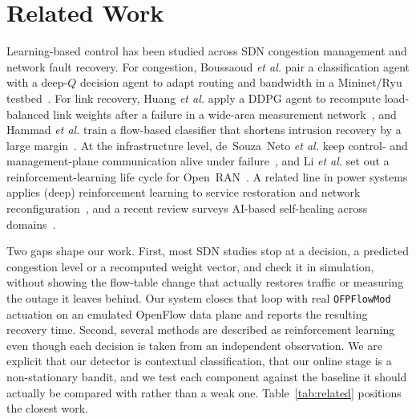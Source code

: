 \documentclass[conference]{IEEEtran}
\begin{document}
\section{Related Work}
\label{sec:related}
Learning-based control has been studied across SDN congestion management and network
fault recovery. For congestion, Boussaoud \emph{et al.} pair a classification agent
with a deep-$Q$ decision agent to adapt routing and bandwidth in a Mininet/Ryu
testbed~\cite{boussaoud2025}. For link recovery, Huang \emph{et al.} apply a DDPG
agent to recompute load-balanced link weights after a failure in a wide-area
measurement network~\cite{huang2025}, and Hammad \emph{et al.} train a flow-based
classifier that shortens intrusion recovery by a large margin~\cite{hammad2023}. At
the infrastructure level, de~Souza~Neto \emph{et al.} keep control- and
management-plane communication alive under failure~\cite{neto2020}, and Li
\emph{et al.} set out a reinforcement-learning life cycle for Open~RAN~\cite{li2022rlops}.
A related line in power systems applies (deep) reinforcement learning to service
restoration and network reconfiguration~\cite{ferreira2019,jo2024}, and a recent
review surveys AI-based self-healing across domains~\cite{kumar2023}.

Two gaps shape our work. First, most SDN studies stop at a decision, a predicted
congestion level or a recomputed weight vector, and check it in simulation, without
showing the flow-table change that actually restores traffic or measuring the outage
it leaves behind. Our system closes that loop with real \texttt{OFPFlowMod} actuation
on an emulated OpenFlow data plane and reports the resulting recovery time. Second,
several methods are described as reinforcement learning even though each decision is
taken from an independent observation. We are explicit that our detector is
contextual classification, that our online stage is a non-stationary bandit, and we
test each component against the baseline it should actually be compared with rather
than a weak one. Table~\ref{tab:related} positions the closest work.
\end{document}
